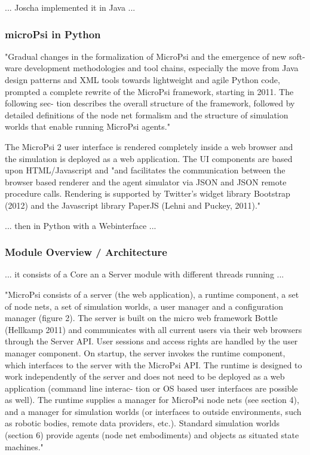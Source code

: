 ... Joscha implemented it in Java ...

        \subsubsection{microPsi in Python}

"Gradual changes in the formalization of MicroPsi and the emergence of new soft- ware development methodologies and tool chains, especially the move from Java design patterns and XML tools towards lightweight and agile Python code, prompted a complete rewrite of the MicroPsi framework, starting in 2011. The following sec- tion describes the overall structure of the framework, followed by detailed definitions of the node net formalism and the structure of simulation worlds that enable running MicroPsi agents."~\cite{conf/agi/Bach12}

The MicroPsi 2 user interface is rendered completely inside a web browser and the simulation is deployed as a web application. The UI components are based upon HTML/Javascript and "and facilitates the communication between the browser based renderer and the agent simulator via JSON and JSON remote procedure calls. Rendering is supported by Twitter’s widget library Bootstrap (2012) and the Javascript library PaperJS (Lehni and Puckey, 2011)."~\cite{conf/agi/Bach12}

... then in Python with a Webinterface ...

        \subsubsection{Module Overview / Architecture}
... it consists of a Core an a Server module with different threads running ...

"MicroPsi consists of a server (the web application), a runtime component, a set of node nets, a set of simulation worlds, a user manager and a configuration manager (figure 2). The server is built on the micro web framework Bottle (Hellkamp 2011) and communicates with all current users via their web browsers through the Server API. User sessions and access rights are handled by the user manager component.
On startup, the server invokes the runtime component, which interfaces to the server with the MicroPsi API. The runtime is designed to work independently of the server and does not need to be deployed as a web application (command line interac- tion or OS based user interfaces are possible as well).
The runtime supplies a manager for MicroPsi node nets (see section 4), and a manager for simulation worlds (or interfaces to outside environments, such as robotic bodies, remote data providers, etc.). Standard simulation worlds (section 6) provide agents (node net embodiments) and objects as situated state machines."~\cite{conf/agi/Bach12}

